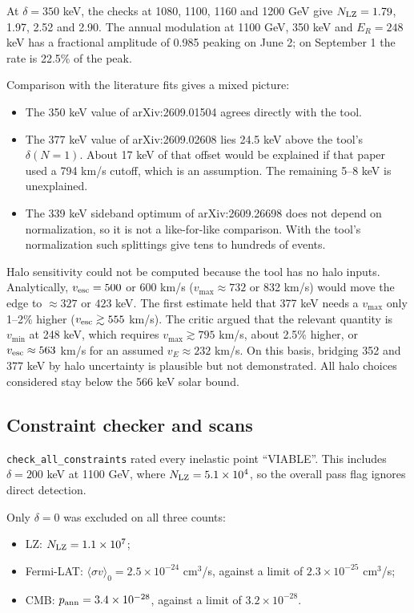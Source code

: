 \documentclass[11pt,a4paper]{article}
\begin{document}
At $\delta=350$ keV, the checks at 1080, 1100, 1160 and 1200 GeV give $N_{\rm LZ}=1.79$, 1.97, 2.52 and 2.90. The annual modulation at 1100 GeV, 350 keV and $E_R=248$ keV has a fractional amplitude of 0.985 peaking on June 2; on September 1 the rate is 22.5\% of the peak.

Comparison with the literature fits gives a mixed picture:
\begin{itemize}
\item The 350 keV value of arXiv:2609.01504 agrees directly with the tool.
\item The 377 keV value of arXiv:2609.02608 lies 24.5 keV above the tool's $\delta(N=1)$. About 17 keV of that offset would be explained if that paper used a 794 km/s cutoff, which is an assumption. The remaining 5--8 keV is unexplained.
\item The 339 keV sideband optimum of arXiv:2609.26698 does not depend on normalization, so it is not a like-for-like comparison. With the tool's normalization such splittings give tens to hundreds of events.
\end{itemize}

Halo sensitivity could not be computed because the tool has no halo inputs. Analytically, $v_{\rm esc}=500$ or 600 km/s ($v_{\max}\approx732$ or 832 km/s) would move the edge to $\approx327$ or $423$ keV. The first estimate held that 377 keV needs a $v_{\max}$ only 1--2\% higher ($v_{\rm esc}\gtrsim555$ km/s). The critic argued that the relevant quantity is $v_{\min}$ at 248 keV, which requires $v_{\max}\gtrsim795$ km/s, about 2.5\% higher, or $v_{\rm esc}\approx563$ km/s for an assumed $v_E\approx232$ km/s. On this basis, bridging 352 and 377 keV by halo uncertainty is plausible but not demonstrated. All halo choices considered stay below the 566 keV solar bound.

\subsection{Constraint checker and scans}
\texttt{check\_all\_constraints} rated every inelastic point ``VIABLE''. This includes $\delta=200$ keV at 1100 GeV, where $N_{\rm LZ}=5.1\times10^4$, so the overall pass flag ignores direct detection.

Only $\delta=0$ was excluded on all three counts:
\begin{itemize}
\item LZ: $N_{\rm LZ}=1.1\times10^7$;
\item Fermi-LAT: $\langle\sigma v\rangle_0=2.5\times10^{-24}$ cm$^3$/s, against a limit of $2.3\times10^{-25}$ cm$^3$/s;
\item CMB: $p_{\rm ann}=3.4\times10^{-28}$, against a limit of $3.2\times10^{-28}$.
\end{itemize}
\end{document}
